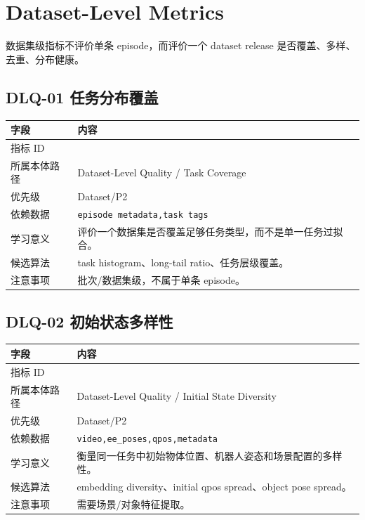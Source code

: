 \documentclass[UTF8,zihao=-4,oneside,openany]{ctexrep}
\newcommand{\Code}[1]{\texttt{#1}}
\newcommand{\MID}[1]{\texttt{\seqsplit{#1}}}
\begin{document}
\section{Dataset-Level Metrics}

数据集级指标不评价单条 episode，而评价一个 dataset release 是否覆盖、多样、去重、分布健康。


\subsection{DLQ-01 任务分布覆盖}

\begin{longtable}{L{3.6cm} L{9.6cm}}
\toprule
字段 & 内容 \\
\midrule
指标 ID & \MID{DLQ-01} \\
所属本体路径 & Dataset-Level Quality / Task Coverage \\
优先级 & Dataset/P2 \\
依赖数据 & \Code{episode metadata,task tags} \\
学习意义 & 评价一个数据集是否覆盖足够任务类型，而不是单一任务过拟合。 \\
候选算法 & task histogram、long-tail ratio、任务层级覆盖。 \\
注意事项 & 批次/数据集级，不属于单条 episode。 \\
\bottomrule
\end{longtable}

\subsection{DLQ-02 初始状态多样性}

\begin{longtable}{L{3.6cm} L{9.6cm}}
\toprule
字段 & 内容 \\
\midrule
指标 ID & \MID{DLQ-02} \\
所属本体路径 & Dataset-Level Quality / Initial State Diversity \\
优先级 & Dataset/P2 \\
依赖数据 & \Code{video,ee\_poses,qpos,metadata} \\
学习意义 & 衡量同一任务中初始物体位置、机器人姿态和场景配置的多样性。 \\
候选算法 & embedding diversity、initial qpos spread、object pose spread。 \\
注意事项 & 需要场景/对象特征提取。 \\
\bottomrule
\end{longtable}
\end{document}
